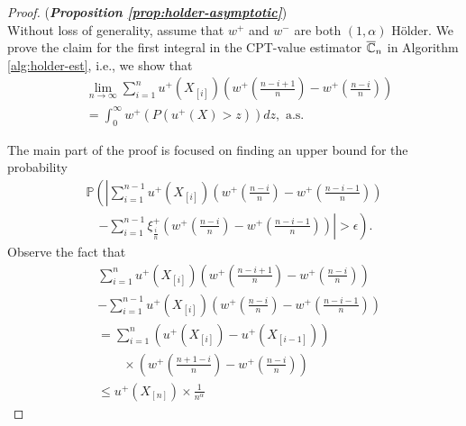 \begin{proof}(\textbf{\textit{Proposition \ref{prop:holder-asymptotic}}})\ \\
Without loss of generality, assume that   $w^+$ and $w^-$ are both 
$(1, \alpha)$ H\"{o}lder.
We prove the claim for the first integral in the CPT-value estimator $\overline {\mathbb{C}}_n$ in Algorithm \ref{alg:holder-est}, i.e., we show  that 
\begin{align}
&\lim_{n\rightarrow \infty} \sum_{i=1}^{n} u^+\left(X_{[i]}\right) \left(w^+\left(\frac{n-i+1}{n}\right)- w^+\left(\frac{n-i}{n}\right)\right)\nonumber\\
&= \int_0^{\infty} w^+\left(P\left(u^+(X)>z\right)\right) dz , \text{ a.s.} 
\label{eq:claim11}
\end{align}


The main part of the proof is focused on finding an upper bound for the probability
\begin{align*}
\mathbb{P} \left( \left| \sum_{i=1}^{n-1} u^+\left(X_{[i]}\right)  \left(w^+\left(\frac{n-i}{n} \right)  - w^+\left(\frac{n-i-1}{n} \right) \right) \right.\right.\\
\quad\left.\left. -
\sum_{i=1}^{n-1} \xi^+_{\frac{i}{n}}  \left(w^+\left(\frac{n-i}{n} \right)  - w^+\left(\frac{n-i-1}{n} \right) \right) \right| >
\epsilon\right).
\end{align*}
Observe the fact that 
\begin{align*}
&\sum_{i=1}^{n} u^+\left(X_{[i]}\right) \left(w^+\left(\frac{n-i+1}{n}\right)- w^+\left(\frac{n-i}{n}\right)\right)\nonumber\\
&-\sum_{i=1}^{n-1} u^+\left(X_{[i]}\right) \left(w^+\left(\frac{n-i}{n}\right)- w^+\left(\frac{n-i-1}{n}\right)\right)\\
&=\sum_{i=1}^{n} \left(u^+\left(X_{[i]}\right) - u^+\left(X_{[i-1]}\right)\right)\\
&\qquad\times \left(w^+\left(\frac{n+1-i}{n}\right) 
-w^+\left(\frac{n-i}{n}\right)  \right) \\
&\leq u^+\left(X_{[n]}\right) \times \frac{1}{n^{\alpha}}
\end{align*}


\end{proof}
